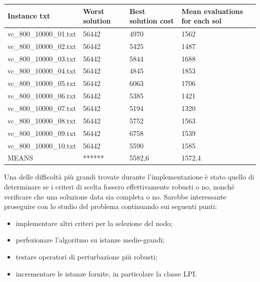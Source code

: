 \documentclass[11pt]{article}
\begin{document}
\begin{table}[!ht]
    \centering
    \begin{tabular}{|l|l|l|l|}
    \hline
        Instance txt & Worst solution & Best solution cost & Mean evaluations for each sol \\ \hline
        vc\_800\_10000\_01.txt & 56442 & 4970 & 1562 \\ \hline
        vc\_800\_10000\_02.txt & 56442 & 5425 & 1487 \\ \hline
        vc\_800\_10000\_03.txt & 56442 & 5844 & 1688 \\ \hline
        vc\_800\_10000\_04.txt & 56442 & 4845 & 1853 \\ \hline
        vc\_800\_10000\_05.txt & 56442 & 6063 & 1706 \\ \hline
        vc\_800\_10000\_06.txt & 56442 & 5385 & 1421 \\ \hline
        vc\_800\_10000\_07.txt & 56442 & 5194 & 1320 \\ \hline
        vc\_800\_10000\_08.txt & 56442 & 5752 & 1563 \\ \hline
        vc\_800\_10000\_09.txt & 56442 & 6758 & 1539 \\ \hline
        vc\_800\_10000\_10.txt & 56442 & 5590 & 1585 \\ \hline
        MEANS & ****** & 5582,6 & 1572,4 \\ \hline
    \end{tabular}
\end{table}

\pagebreak

Una delle difficoltà più grandi trovate durante l'implementazione è stato quello di determinare se i criteri di scelta fossero effettivamente robusti o no, nonché verificare che una soluzione data sia completa o no.
Sarebbe interessante proseguire con lo studio del problema continuando sui seguenti punti:

\begin{itemize}
    \item{implementare altri criteri per la selezione del nodo;}
    \item{perfezionare l'algoritmo su istanze medie-grandi;}
    \item{testare operatori di perturbazione più robusti;}
    \item {incrementare le istanze fornite, in particolare la classe LPI.}
\end{itemize}

\pagebreak
\end{document}

